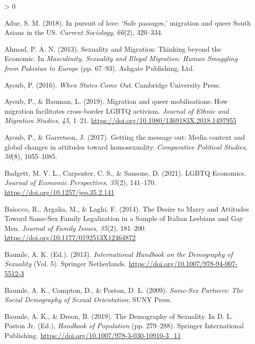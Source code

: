 \documentclass[
  12pt,
]{article}
\newlength{\cslhangindent}
\newenvironment{CSLReferences}[2] %
 {%
  \setlength{\parindent}{0pt}
  \ifodd #1 \everypar{\setlength{\hangindent}{\cslhangindent}}\ignorespaces\fi
  \ifnum #2 > 0
  \setlength{\parskip}{#2\baselineskip}
  \fi
 }%
 {}
\begin{document}
\hypertarget{refs}{}
\begin{CSLReferences}{1}{0}
\leavevmode\hypertarget{ref-adur_2018}{}%
Adur, S. M. (2018). In pursuit of love: {`{Safe} passages,'} migration and queer {South Asians} in the {US}. \emph{Current Sociology}, \emph{66}(2), 320--334.

\leavevmode\hypertarget{ref-ahmad_2013}{}%
Ahmad, P. A. N. (2013). Sexuality and {Migration}: Thinking beyond the {Economic}. In \emph{Masculinity, {Sexuality} and {Illegal Migration}: Human {Smuggling} from {Pakistan} to {Europe}} (pp. 67--93). {Ashgate Publishing, Ltd.}

\leavevmode\hypertarget{ref-ayoub_2016}{}%
Ayoub, P. (2016). \emph{When {States Come Out}}. {Cambridge University Press}.

\leavevmode\hypertarget{ref-ayoub_2019_migration}{}%
Ayoub, P., \& Bauman, L. (2019). Migration and queer mobilisations: How migration facilitates cross-border {LGBTQ} activism. \emph{Journal of Ethnic and Migration Studies}, \emph{45}, 1--21. \url{https://doi.org/10.1080/1369183X.2018.1497955}

\leavevmode\hypertarget{ref-ayoub_2017}{}%
Ayoub, P., \& Garretson, J. (2017). Getting the message out: Media context and global changes in attitudes toward homosexuality. \emph{Comparative Political Studies}, \emph{50}(8), 1055--1085.

\leavevmode\hypertarget{ref-badgett_2021_lgbtq}{}%
Badgett, M. V. L., Carpenter, C. S., \& Sansone, D. (2021). {LGBTQ Economics}. \emph{Journal of Economic Perspectives}, \emph{35}(2), 141--170. \url{https://doi.org/10.1257/jep.35.2.141}

\leavevmode\hypertarget{ref-baiocco_2014_desire}{}%
Baiocco, R., Argalia, M., \& Laghi, F. (2014). The {Desire} to {Marry} and {Attitudes Toward Same}-{Sex Family Legalization} in a {Sample} of {Italian Lesbians} and {Gay Men}. \emph{Journal of Family Issues}, \emph{35}(2), 181--200. \url{https://doi.org/10.1177/0192513X12464872}

\leavevmode\hypertarget{ref-baumle_2013}{}%
Baumle, A. K. (Ed.). (2013). \emph{International {Handbook} on the {Demography} of {Sexuality}} (Vol. 5). {Springer Netherlands}. \url{https://doi.org/10.1007/978-94-007-5512-3}

\leavevmode\hypertarget{ref-baumle_2009}{}%
Baumle, A. K., Compton, D., \& Poston, D. L. (2009). \emph{Same-{Sex Partners}: The {Social Demography} of {Sexual Orientation}}. {SUNY Press}.

\leavevmode\hypertarget{ref-baumle_2019}{}%
Baumle, A. K., \& Dreon, B. (2019). The {Demography} of {Sexuality}. In D. L. Poston Jr. (Ed.), \emph{Handbook of {Population}} (pp. 279--288). {Springer International Publishing}. \url{https://doi.org/10.1007/978-3-030-10910-3_11}


\end{CSLReferences}
\end{document}
